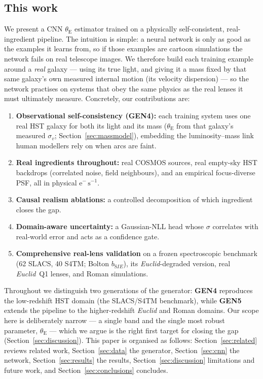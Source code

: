 \documentclass[fleqn,usenatbib]{mnras}
\newcommand{\thetaE}{\theta_{\mathrm{E}}}
\newcommand{\sigmav}{\sigma_{v}}
\newcommand{\bsie}{b_{\mathrm SIE}}
\newcommand{\eps}{\ensuremath{\mathrm{e^{-}\,s^{-1}}}}
\begin{document}
\subsection{This work}
We present a CNN $\thetaE$ estimator trained on a physically self-consistent,
real-ingredient pipeline. The intuition is simple: a neural network is only as
good as the examples it learns from, so if those examples are cartoon
simulations the network fails on real telescope images. We therefore build each
training example around a \emph{real} galaxy --- using its true light, and giving
it a mass fixed by that same galaxy's own measured internal motion (its velocity
dispersion) --- so the network practises on systems that obey the same physics as
the real lenses it must ultimately measure. Concretely, our contributions are:
\begin{enumerate}
\item \textbf{Observational self-consistency (GEN4):} each training system uses
one real HST galaxy for both its light and its mass ($\thetaE$ from that
galaxy's measured $\sigmav$; Section~\ref{sec:massmodel}), embedding the
luminosity--mass link human modellers rely on when arcs are faint.
\item \textbf{Real ingredients throughout:} real COSMOS sources, real empty-sky
HST backdrops (correlated noise, field neighbours), and an empirical
focus-diverse PSF, all in physical \eps.
\item \textbf{Causal realism ablations:} a controlled decomposition of which
ingredient closes the gap.
\item \textbf{Domain-aware uncertainty:} a Gaussian-NLL head whose $\sigma$
correlates with real-world error and acts as a confidence gate.
\item \textbf{Comprehensive real-lens validation} on a frozen spectroscopic
benchmark (62 SLACS, 40 S4TM; Bolton $\bsie$), its \textit{Euclid}-degraded
version, real \textit{Euclid}~Q1 lenses, and Roman simulations.
\end{enumerate}
Throughout we distinguish two generations of the generator: \textbf{GEN4}
reproduces the low-redshift HST domain (the SLACS/S4TM benchmark), while
\textbf{GEN5} extends the pipeline to the higher-redshift \textit{Euclid} and
Roman domains. Our scope here is deliberately narrow --- a single band and the
single most robust parameter, $\thetaE$ --- which we argue is the right first
target for closing the gap (Section~\ref{sec:discussion}). This paper is
organised as follows: Section~\ref{sec:related} reviews related work,
Section~\ref{sec:data} the generator, Section~\ref{sec:cnn} the network,
Section~\ref{sec:results} the results, Section~\ref{sec:discussion} limitations
and future work, and Section~\ref{sec:conclusions} concludes.
\end{document}

